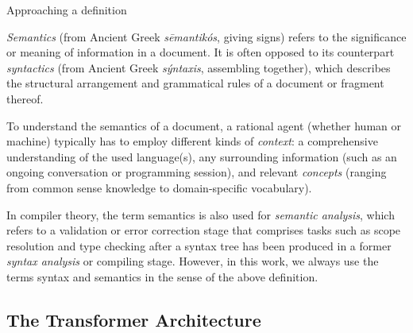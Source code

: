 \begin{genericbox}{Approaching a definition}

	\emph{Semantics} (from Ancient Greek \emph{sēmantikós}, giving signs) refers to the significance or meaning of information in a document.
	It is often opposed to its counterpart \emph{syntactics} (from Ancient Greek \emph{sýntaxis}, assembling together), %
	which describes the structural arrangement and grammatical rules of a document or fragment thereof.

	To understand the semantics of a document, a rational agent (whether human or machine) typically has to employ different kinds of \emph{context}: a comprehensive understanding of the used language(s), any surrounding information (such as an ongoing conversation or programming session), and relevant \emph{concepts} (ranging from common sense knowledge to domain-specific vocabulary).

	In compiler theory, the term semantics is also used for \emph{semantic analysis}, which refers to a validation or error correction stage that comprises tasks such as scope resolution and type checking after a syntax tree has been produced in a former \emph{syntax analysis} or compiling stage.
	However, in this work, we always use the terms syntax and semantics in the sense of the above definition.
\end{genericbox}

\subsection{The Transformer Architecture}

